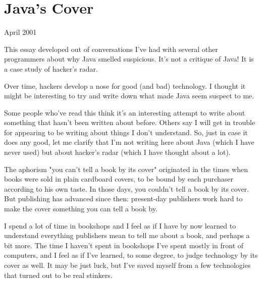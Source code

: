 \chapter{Java's Cover}


            
              
                

April 2001

This essay developed out of
                  conversations I've had with several other programmers about
                  why Java smelled suspicious. It's not a critique of Java! It
                  is a case study of hacker's radar.

Over time,
                  hackers develop a nose for good (and bad) technology. I
                  thought it might be interesting to try and write down what
                  made Java seem suspect to me.

Some people who've
                  read this think it's an interesting attempt to write about
                  something that hasn't been written about before. Others say I
                  will get in trouble for appearing to be writing about things I
                  don't understand. So, just in case it does any good, let me
                  clarify that I'm not writing here about Java (which I have
                  never used) but about hacker's radar (which I have thought
                  about a lot).


                  
                  

The aphorism "you can't tell a book by its cover"
                  originated in the times when books were sold in plain
                  cardboard covers, to be bound by each purchaser according to
                  his own taste. In those days, you couldn't tell a book by its
                  cover. But publishing has advanced since then: present-day
                  publishers work hard to make the cover something you can tell
                  a book by.

I spend a lot of time in bookshops and I
                  feel as if I have by now learned to understand everything
                  publishers mean to tell me about a book, and perhaps a bit
                  more. The time I haven't spent in bookshops I've spent mostly
                  in front of computers, and I feel as if I've learned, to some
                  degree, to judge technology by its cover as well. It may be
                  just luck, but I've saved myself from a few technologies that
                  turned out to be real stinkers.

